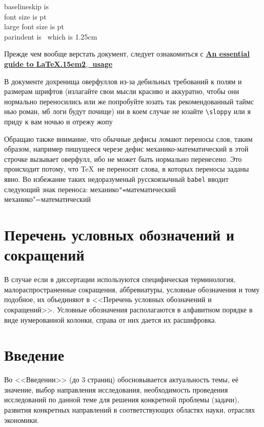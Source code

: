 \documentclass{mpaper}
\renewcommand{\LaTeXe}{\LaTeX\kern.15em2$_{\textstyle\varepsilon}$}
\begin{document}
    \maketitle
    \setcounter{tocdepth}{3}
    \setcounter{page}{2}
    \tableofcontents

    \newpage
    \noindent baselineskip is \the\baselineskip\\
    font size is \makeatletter\f@size\makeatother pt\\
    large font size is {\normalsizerrr \makeatletter\f@size\makeatother} pt\\
    parindent is \the\parindent\ which is 1.25cm

    Прежде чем вообще верстать документ, следует ознакомиться с \href{http://anorien.csc.warwick.ac.uk/mirrors/CTAN/info/l2tabu/english/l2tabuen.pdf}{\bfseries An essential guide to \LaTeXe\ usage}

    В документе дохренища оверфуллов из-за дебильных требований к полям и размерам шрифтов (излагайте свои мысли красиво и аккуратно, чтобы они нормально переносились или же попробуйте юзать так рекомендованный таймс нью роман, мб логи будут почище) ни в коем случае не юзайте \verb|\sloppy| или я приду к вам ночью и отрежу жопу

    Обращаю также внимание, что обычные дефисы ломают переносы слов, таким образом, например пишущееся черезе дефис механико-математический в этой строчке вызывает оверфулл, ибо не может быть нормально перенесено. Это происходит потому, что \TeX\ не переносит слова, в которых переносы заданы явно. Во избежание таких недоразуменый русскоязычный \verb|babel| вводит следующий знак переноса: механико\verb|"=|математический механико"=математический

    \chapter*{Перечень условных обозначений и сокращений}
    В случае если в диссертации используются специфическая терминология, малораспространенные сокращения, аббревиатуры, условные обозначения и тому подобное, их объединяют в <<Перечень условных обозначений и сокращений>>. Условные обозначения располагаются в алфавитном порядке в виде нумерованной колонки, справа от них дается их расшифровка.
    \chapter*{Введение}
    Во <<Введении>> (до 3 страниц) обосновывается актуальность темы, её значение, выбор направления исследования, необходимость проведения исследований по данной теме для решения конкретной проблемы (задачи), развития конкретных направлений в соответствующих областях науки, отраслях экономики.
\end{document}

